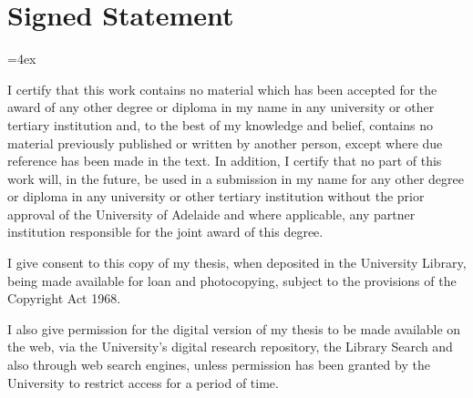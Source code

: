 \chapter{Signed Statement}
{\parindent=0pt\parskip=4ex

%
%
%



I certify that this work contains no material which has been accepted for the award of any other degree or diploma in my name in any university or other tertiary institution and, to the best of my knowledge and belief, contains no material previously published or written by another person, except where due reference has been made in the text. In addition, I certify that no part of this work will, in the future, be used in a submission in my name for any other degree or diploma in any university or other tertiary institution without the prior approval of the University of Adelaide and where applicable, any partner institution responsible for the joint award of this degree.

I give consent to this copy of my thesis, when deposited in the University Library, being made available for loan and photocopying, subject to the provisions of the Copyright Act 1968.

I also give permission for the digital version of my thesis to be made available on the web, via the University's digital research repository, the Library Search and also through web search engines, unless permission has been granted by the University to restrict access for a period of time.

%
%
%

}
